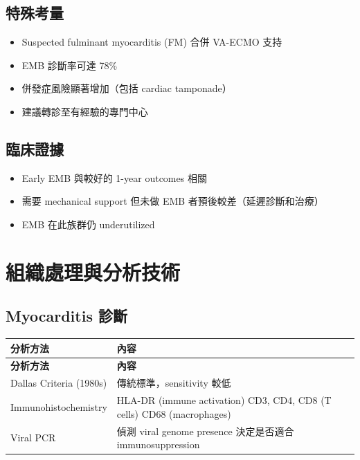 \documentclass[12pt,a4paper]{article}
\begin{document}
\subsection{特殊考量}

\begin{itemize}
    \item Suspected fulminant myocarditis (FM) 合併 VA-ECMO 支持
    \item EMB 診斷率可達 78\%
    \item 併發症風險顯著增加（包括 cardiac tamponade）
    \item 建議轉診至有經驗的專門中心
\end{itemize}

\subsection{臨床證據}

\begin{itemize}
    \item Early EMB 與較好的 1-year outcomes 相關
    \item 需要 mechanical support 但未做 EMB 者預後較差（延遲診斷和治療）
    \item EMB 在此族群仍 underutilized
\end{itemize}

\section{組織處理與分析技術}

\subsection{Myocarditis 診斷}

\begin{longtable}{p{4cm}p{10cm}}
\toprule
\textbf{分析方法} & \textbf{內容} \\
\midrule
\endfirsthead

\toprule
\textbf{分析方法} & \textbf{內容} \\
\midrule
\endhead

\bottomrule
\endfoot

Dallas Criteria (1980s) & 傳統標準，sensitivity 較低 \\
\midrule
Immunohistochemistry & HLA-DR (immune activation)\newline
CD3, CD4, CD8 (T cells)\newline
CD68 (macrophages) \\
\midrule
Viral PCR & 偵測 viral genome presence\newline
決定是否適合 immunosuppression \\
\bottomrule
\end{longtable}
\end{document}
